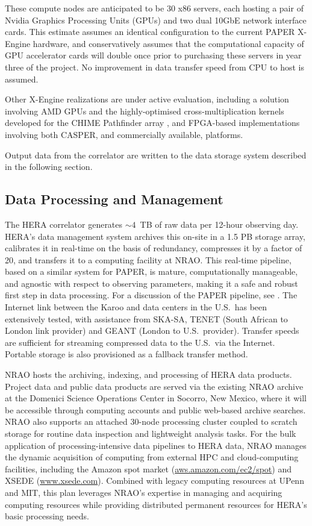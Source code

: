 \documentclass[preprint,11pt]{aastex}
\newcommand{\Mycitep}[1]{\citep{#1}}
\begin{document}
These compute nodes are anticipated to be 30 x86 servers, each hosting a pair of Nvidia Graphics Processing Units (GPUs) and two dual 10GbE network interface cards.
This estimate assumes an identical configuration to the current PAPER X-Engine hardware, and conservatively assumes that the computational capacity of GPU accelerator cards will double once prior to purchasing these servers in year three of the project.
No improvement in data transfer speed from CPU to host is assumed.

Other X-Engine realizations are under active evaluation, including a solution involving AMD GPUs and the highly-optimised cross-multiplication kernels developed for the CHIME Pathfinder array \Mycitep{Denman_Chime_X}, and FPGA-based implementations involving both CASPER, and commercially available, platforms.

Output data from the correlator are written to the data storage system described in the following section.

\subsection{Data Processing and Management}
\label{sec:data}
\noindent The HERA correlator generates $\sim4$~TB of raw data per 12-hour observing day.
HERA's data management system archives this on-site in a 1.5 PB storage array, calibrates it in real-time
on the basis of redundancy, compresses it by a factor of 20, and transfers it to a computing facility at NRAO.
This real-time pipeline, based on a similar system for PAPER, is mature, computationally manageable, and 
agnostic with respect to observing parameters, making it a safe and robust first step in data processing.  For a discussion
of the PAPER pipeline, see
\cite{zheng_et_al2014,parsons_etal2014,ali_et_al2015}.
The Internet link between the Karoo and data centers in the U.S.\ has been extensively tested, with assistance from SKA-SA, TENET
(South African to London link provider) and GEANT (London to U.S.\ provider).   
Transfer speeds are sufficient for streaming compressed data to the U.S.\ via the Internet. Portable storage is also
provisioned as a fallback transfer method.

NRAO hosts the archiving, indexing, and processing of HERA data products. 
Project data and public data products are served via the existing 
NRAO archive at the Domenici Science Operations Center %
in Socorro, New Mexico, where it will be accessible through computing accounts and public web-based
archive searches.
NRAO also supports
an attached 30-node processing cluster 
coupled to 
scratch storage
for routine data inspection and lightweight analysis tasks.
For the bulk application of processing-intensive data pipelines to HERA data,
NRAO manages the dynamic acquisition of computing from
external HPC and cloud-computing facilities, including the Amazon spot market (\url{aws.amazon.com/ec2/spot}) and XSEDE (\url{www.xsede.com}). 
Combined with legacy computing resources at UPenn and MIT, this plan leverages NRAO's
expertise in managing and acquiring computing resources while providing distributed
permanent resources for HERA's basic processing needs.
\end{document}
